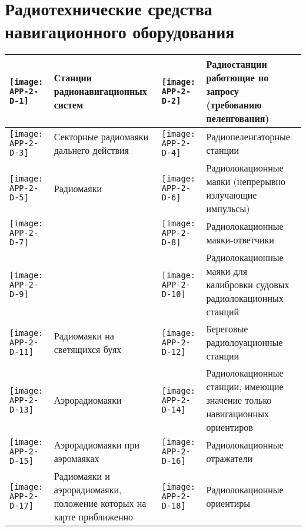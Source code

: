 \section{Радиотехнические средства навигационного оборудования}%

\small
\begin{longtable}{M|m{0.2\textwidth}|M|m{0.2\textwidth}}
  \toprule
  \texttt{[image: APP-2-D-1]} & Станции радионавигационных систем &
  \texttt{[image: APP-2-D-2]} & Радиостанции работющие по запросу (требованию пеленгования) \\
  \midrule
  \texttt{[image: APP-2-D-3]} & Секторные радиомаяки дальнего действия &
  \texttt{[image: APP-2-D-4]} & Радиопеленгаторные станции \\
  \midrule
  \texttt{[image: APP-2-D-5]} & Радиомаяки &
  \texttt{[image: APP-2-D-6]} & Радиолокационные маяки (непрерывно излучающие импульсы) \\
  \midrule
  \texttt{[image: APP-2-D-7]} &  &
  \texttt{[image: APP-2-D-8]} & Радиолокационные маяки-ответчики \\
  \texttt{[image: APP-2-D-9]} & &
  \texttt{[image: APP-2-D-10]} & Радиолокационные маяки для калибровки судовых радиолокационных станций \\
  \midrule
  \texttt{[image: APP-2-D-11]} & Радиомаяки на светящихся буях &
  \texttt{[image: APP-2-D-12]} & Береговые радиолоуационные станции \\
  \midrule
  \texttt{[image: APP-2-D-13]} & Аэрорадиомаяки &
  \texttt{[image: APP-2-D-14]} & Радиолокационные станции, имеющие значение только навигационных ориентиров \\
  \midrule
  \texttt{[image: APP-2-D-15]} & Аэрорадиомаяки при аэромаяках &
  \texttt{[image: APP-2-D-16]} & Радиолокационные отражатели \\
  \midrule
  \texttt{[image: APP-2-D-17]} & Радиомаяки и аэрорадиомаяки, положение которых на карте приближенно &
  \texttt{[image: APP-2-D-18]} & Радиолокационные ориентиры \\
  \bottomrule
\end{longtable}
